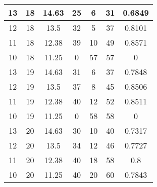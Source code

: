 \documentclass[letterpaper, 12pt]{article}
\begin{document}
\begin{longtable}{|c|c|c|c|c|c|c|}
\hline
13 & 18 & 14.63 & 25 & 6 & 31 & 0.6849 \\
\hline
12 & 18 & 13.5 & 32 & 5 & 37 & 0.8101 \\
\hline
11 & 18 & 12.38 & 39 & 10 & 49 & 0.8571 \\
\hline
10 & 18 & 11.25 & 0 & 57 & 57 & 0 \\
\hline
13 & 19 & 14.63 & 31 & 6 & 37 & 0.7848 \\
\hline
12 & 19 & 13.5 & 37 & 8 & 45 & 0.8506 \\
\hline
11 & 19 & 12.38 & 40 & 12 & 52 & 0.8511 \\
\hline
10 & 19 & 11.25 & 0 & 58 & 58 & 0 \\
\hline
13 & 20 & 14.63 & 30 & 10 & 40 & 0.7317 \\
\hline
12 & 20 & 13.5 & 34 & 12 & 46 & 0.7727 \\
\hline
11 & 20 & 12.38 & 40 & 18 & 58 & 0.8 \\
\hline
10 & 20 & 11.25 & 40 & 20 & 60 & 0.7843 \\
\hline
\end{longtable}
\end{document}
